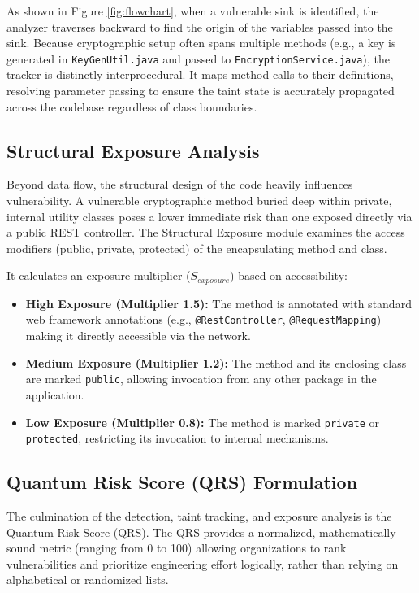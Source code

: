 \documentclass[conference]{IEEEtran}
\begin{document}
As shown in Figure \ref{fig:flowchart}, when a vulnerable sink is identified, the analyzer traverses backward to find the origin of the variables passed into the sink. Because cryptographic setup often spans multiple methods (e.g., a key is generated in \texttt{KeyGenUtil.java} and passed to \texttt{EncryptionService.java}), the tracker is distinctly interprocedural. It maps method calls to their definitions, resolving parameter passing to ensure the taint state is accurately propagated across the codebase regardless of class boundaries.

\subsection{Structural Exposure Analysis}
Beyond data flow, the structural design of the code heavily influences vulnerability. A vulnerable cryptographic method buried deep within private, internal utility classes poses a lower immediate risk than one exposed directly via a public REST controller. The Structural Exposure module examines the access modifiers (public, private, protected) of the encapsulating method and class. 

It calculates an exposure multiplier ($S_{exposure}$) based on accessibility:
\begin{itemize}
    \item \textbf{High Exposure (Multiplier 1.5):} The method is annotated with standard web framework annotations (e.g., \texttt{@RestController}, \texttt{@RequestMapping}) making it directly accessible via the network.
    \item \textbf{Medium Exposure (Multiplier 1.2):} The method and its enclosing class are marked \texttt{public}, allowing invocation from any other package in the application.
    \item \textbf{Low Exposure (Multiplier 0.8):} The method is marked \texttt{private} or \texttt{protected}, restricting its invocation to internal mechanisms.
\end{itemize}

\subsection{Quantum Risk Score (QRS) Formulation}
The culmination of the detection, taint tracking, and exposure analysis is the Quantum Risk Score (QRS). The QRS provides a normalized, mathematically sound metric (ranging from 0 to 100) allowing organizations to rank vulnerabilities and prioritize engineering effort logically, rather than relying on alphabetical or randomized lists.
\end{document}
